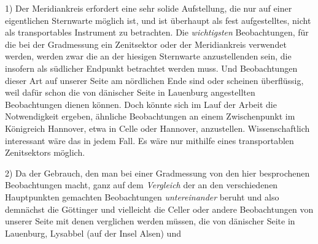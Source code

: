 1) Der Meridiankreis erfordert eine sehr solide Aufstellung, die nur auf einer eigentlichen Sternwarte möglich ist, und ist überhaupt als fest aufgestelltes, nicht als transportables Instrument zu betrachten. Die \textit{wichtigsten} Beobachtungen, für die bei der Gradmessung ein Zenitsektor oder der Meridiankreis verwendet werden, werden zwar die an der hiesigen Sternwarte anzustellenden sein, die insofern als südlicher Endpunkt betrachtet werden muss. Und Beobachtungen dieser Art auf unserer Seite am nördlichen Ende sind oder scheinen überflüssig, weil dafür schon die von dänischer Seite in Lauenburg angestellten Beobachtungen dienen können. Doch könnte sich im Lauf der Arbeit die Notwendigkeit ergeben, ähnliche Beobachtungen an einem Zwischenpunkt im Königreich Hannover, etwa in Celle oder Hannover, anzustellen. Wissenschaftlich interessant wäre das in jedem Fall. Es wäre nur mithilfe eines transportablen Zenitsektors möglich.

2) Da der Gebrauch, den man bei einer Gradmessung von den hier besprochenen Beobachtungen macht, ganz auf dem \textit{Vergleich} der an den verschiedenen Hauptpunkten gemachten Beobachtungen \textit{untereinander} beruht und also demnächst die Göttinger und vielleicht die Celler oder andere Beobachtungen von unserer Seite mit denen verglichen werden müssen, die von dänischer Seite in Lauenburg, Lysabbel (auf der Insel Alsen) und
